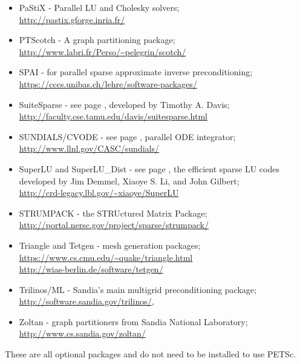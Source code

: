 \begin{itemize}
             \item PaStiX -     Parallel LU and Cholesky solvers; \\\href{http://pastix.gforge.inria.fr/}{http://pastix.gforge.inria.fr/}
             \item PTScotch -    A graph partitioning package; \\\href{http://www.labri.fr/Perso/~pelegrin/scotch/}{http://www.labri.fr/Perso/\~{}pelegrin/scotch/}
  \item SPAI -        for parallel sparse approximate inverse preconditioning;\\ \href{https://cccs.unibas.ch/lehre/software-packages/}{https://cccs.unibas.ch/lehre/software-packages/}
  \item SuiteSparse - see page \pageref{sec_externalsol}, developed by Timothy A. Davis;\\
                    \href{http://faculty.cse.tamu.edu/davis/suitesparse.html}{http://faculty.cse.tamu.edu/davis/suitesparse.html}
  \item SUNDIALS/CVODE - see page \pageref{sec_sundials}, parallel ODE integrator;\\
                     \href{http://www.llnl.gov/CASC/sundials/}{http://www.llnl.gov/CASC/sundials/}
  \item SuperLU and SuperLU\_Dist - see page \pageref{sec_externalsol},
                    the efficient sparse LU codes developed by Jim Demmel,  Xiaoye S. Li, and John Gilbert;\\
                    \href{http://crd-legacy.lbl.gov/~xiaoye/SuperLU}{http://crd-legacy.lbl.gov/\~{}xiaoye/SuperLU}
                    \item STRUMPACK - the STRUctured Matrix Package; \\
                    \href{http://portal.nersc.gov/project/sparse/strumpack/}{http://portal.nersc.gov/project/sparse/strumpack/}
  \item Triangle and Tetgen - mesh generation packages; \\
    \href{https://www.cs.cmu.edu/~quake/triangle.html}{https://www.cs.cmu.edu/\~{}quake/triangle.html}\\
    \href{http://wias-berlin.de/software/tetgen/}{http://wias-berlin.de/software/tetgen/}
  \item Trilinos/ML - Sandia's main multigrid preconditioning package; \\\href{http://software.sandia.gov/trilinos/}{http://software.sandia.gov/trilinos/},
  \item Zoltan - graph partitioners from Sandia National Laboratory;\\ \href{http://www.cs.sandia.gov/zoltan/}{http://www.cs.sandia.gov/zoltan/}
\end{itemize}
These are all optional packages and do not need to be installed to use PETSc.

